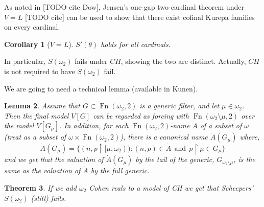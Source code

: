 \documentclass{amsart}
\theoremstyle{plain}
\newtheorem{theorem}{Theorem}
\newtheorem{lemma}[theorem]{Lemma}
\newtheorem{corollary}[theorem]{Corollary}
\theoremstyle{definition}
\theoremstyle{remark}
\theoremstyle{plain}
\theoremstyle{definition}
\theoremstyle{remark}
\begin{document}
  As noted in [TODO cite Dow],
  Jensen's one-gap two-cardinal theorem under \(V=L\) [TODO cite] can be used
  to show that there exist cofinal Kurepa families on every cardinal.

  \begin{corollary}[\(V=L\)]
    \(S'(\theta)\) holds for all cardinals.
  \end{corollary}

  In particular, \(S(\omega_2)\) fails under \(CH\), showing the two are
  distinct. Actually, \(CH\) is not required to have \(S(\omega_2)\) fail.


        We are going to need a technical lemma (available in Kunen).
        \bigskip

        \begin{lemma}
        Assume that $G\subset \operatorname{Fn}(\omega_2,2)$ is a generic filter,
         and let $\mu\in \omega_2$. Then the final model $V[G]$ can be
         regarded as forcing  with $\operatorname{Fn}(\omega_2\setminus \mu,
         2)$ over the model $V[G_\mu]$.
        In addition, for each $\operatorname{Fn}(\omega_2,2)$-name $\dot A$
        of a subset of $\omega$ (treat as a subset of $\omega\times
        \operatorname{Fn}(\omega_2,2) $),
        there is a canonical name $\dot A(G_\mu)$ where,
        $$\dot A(G_\mu) = \{ (n,p\restriction [\mu,\omega_2))  :
         (n,p)\in \dot A\ \ \mbox{and} \ \ p\restriction \mu\in G_\mu\}$$
        and we get that the valuation of $\dot A(G_\mu)$ by the tail
        of the generic, $G_{\omega_2\setminus \mu}$, is the same as
        the valuation of $\dot A$ by the full generic.
        \end{lemma}


        \begin{theorem}
          If we add $\omega_2$ Cohen reals to a model of CH we get
        that Scheepers' $S(\omega_2)$ (still) fails.
        \end{theorem}
\end{document}
